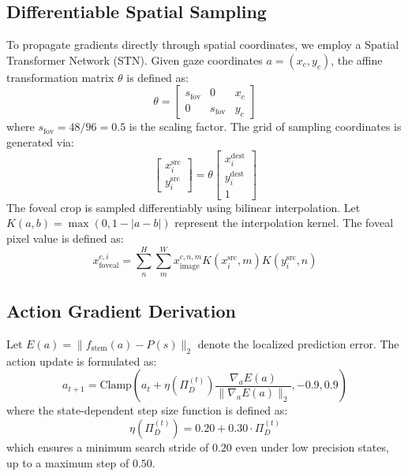 \subsection{Differentiable Spatial Sampling}
To propagate gradients directly through spatial coordinates, we employ a Spatial Transformer Network (STN). Given gaze coordinates $a = (x_c, y_c)$, the affine transformation matrix $\theta$ is defined as:
\begin{equation}
\theta = \begin{bmatrix} s_{\text{fov}} & 0 & x_c \\ 0 & s_{\text{fov}} & y_c \end{bmatrix}
\end{equation}
where $s_{\text{fov}} = 48/96 = 0.5$ is the scaling factor. The grid of sampling coordinates is generated via:
\begin{equation}
\begin{bmatrix} x_i^{\text{src}} \\ y_i^{\text{src}} \end{bmatrix} = \theta \begin{bmatrix} x_i^{\text{dest}} \\ y_i^{\text{dest}} \\ 1 \end{bmatrix}
\end{equation}
The foveal crop is sampled differentiably using bilinear interpolation. Let $K(a, b) = \max(0, 1 - |a - b|)$ represent the interpolation kernel. The foveal pixel value is defined as:
\begin{equation}
x_{\text{foveal}}^{c, i} = \sum_{n}^{H} \sum_{m}^{W} x_{\text{image}}^{c, n, m} K(x_i^{\text{src}}, m) K(y_i^{\text{src}}, n)
\end{equation}

\subsection{Action Gradient Derivation}
Let $E(a) = \| f_{\text{stem}}(a) - P(s) \|_2$ denote the localized prediction error. The action update is formulated as:
\begin{equation}
a_{t+1} = \text{Clamp}\left( a_t + \eta(\Pi_D^{(t)}) \frac{\nabla_{a} E(a)}{\parallel \nabla_{a} E(a) \parallel_2}, -0.9, 0.9 \right)
\end{equation}
where the state-dependent step size function is defined as:
\begin{equation}
\eta(\Pi_D^{(t)}) = 0.20 + 0.30 \cdot \Pi_D^{(t)}
\end{equation}
which ensures a minimum search stride of $0.20$ even under low precision states, up to a maximum step of $0.50$. 

